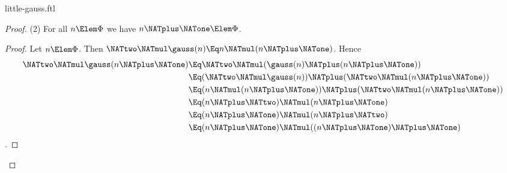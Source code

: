 \documentclass{stex}
\begin{document}
\begin{smodule}{little-gauss.ftl}
\begin{forthel}
\begin{proof}
    (2) For all $n \Elem \Phi$ we have $n \NATplus \NATone \Elem \Phi$.
    \begin{proof}
      Let $n \Elem \Phi$.
      Then $\NATtwo \NATmul \gauss(n) \Eq n \NATmul (n \NATplus \NATone)$.
      Hence
      \begin{align*}
              \NATtwo \NATmul \gauss(n \NATplus \NATone)
        & \Eq \NATtwo \NATmul (\gauss(n) \NATplus (n \NATplus \NATone)) \\
        & \Eq (\NATtwo \NATmul \gauss(n)) \NATplus (\NATtwo \NATmul (n \NATplus \NATone)) \\
        & \Eq (n \NATmul (n \NATplus \NATone)) \NATplus (\NATtwo \NATmul (n \NATplus \NATone)) \\
        & \Eq (n \NATplus \NATtwo) \NATmul (n \NATplus \NATone) \\
        & \Eq (n \NATplus \NATone) \NATmul (n \NATplus \NATtwo) \\
        & \Eq (n \NATplus \NATone) \NATmul ((n \NATplus \NATone) \NATplus \NATone)
      \end{align*}.
    \end{proof}
  \end{proof}
\end{forthel}

\printbibliography
{}
\end{smodule}
\end{document}

